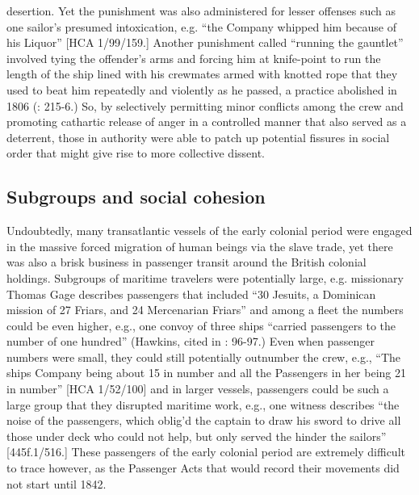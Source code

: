 desertion.  Yet the punishment was also administered for lesser offenses such as one sailor’s presumed intoxication, e.g. “the Company whipped him because of his Liquor” [HCA 1/99/159.] Another punishment called “running the gauntlet” involved tying the offender’s arms and forcing him at knife-point to run the length of the ship lined with his crewmates armed with knotted rope that they used to beat him repeatedly and violently as he passed, a practice abolished in 1806 (\citealt{AdkinsAdkins2008}: 215-6.) So, by selectively permitting minor conflicts among the crew and promoting cathartic release of anger in a controlled manner that also served as a deterrent, those in authority were able to patch up potential fissures in social order that might give rise to more collective dissent. 

\subsection{\textbf{Subgroups} \textbf{and} \textbf{social} \textbf{cohesion}}%

  Undoubtedly, many transatlantic vessels of the early colonial period were engaged in the massive forced migration of human beings via the slave trade, yet there was also a brisk business in passenger transit around the British colonial holdings. Subgroups of maritime travelers were potentially large, e.g. missionary Thomas Gage describes passengers that included “30 Jesuits, a Dominican mission of 27 Friars, and 24 Mercenarian Friars” \citep[15,]{Gage1648} and among a fleet the numbers could be even higher, e.g., one convoy of three ships “carried passengers to the number of one hundred” (Hawkins, cited in \citealt{Bicheno2012}: 96-97.) Even when passenger numbers were small, they could still potentially outnumber the crew, e.g., “The ships Company being about 15 in number and all the Passengers in her being 21 in number” [HCA 1/52/100] and in larger vessels, passengers could be such a large group that they disrupted maritime work, e.g., one witness describes “the noise of the passengers, which oblig’d the captain to draw his sword to drive all those under deck who could not help, but only served the hinder the sailors” [445f.1/516.] These passengers of the early colonial period are extremely difficult to trace however, as the Passenger Acts that would record their movements did not start until 1842.

